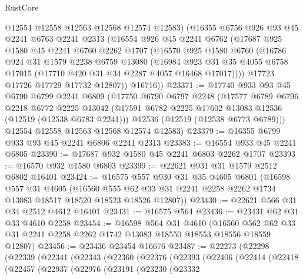 \begin{lexlean}{RustCore}
\begin{coremodule}
        @12554
        @12558
        @12563
        @12568
        @12574
        @12583)
      (@16355
        @6756
        @926
        @93
        @45
        @2241
        @6763
        @2241
        @2313
        (@16554
          @926
          @45
          @2241
          @6762
          (@17687
            @925
            @1580
            @45
            @2241
            @6760
            @2262
            @1707
            (@16570
              @925
              @1580
              @6760
              (@16786
                @924
                @31
                @1579
                @2238
                @6759
                @13080
                (@16984
                  @923
                  @31
                  @35
                  @4055
                  @6758
                  @17015
                  (@17710 @420 @31 @34 @2287 @4057 @16468 @17017))))
            @17723
            @17726
            @17729
            @17732
            @12807))
        @16716))
@23371 := @17740
    @933
    @93
    @45
    @6790
    @6799
    @2241
    @6809
    (@17750
      @6790
      @6797
      @2248
      (@17577
        @6789
        @6796
        @2218
        @6772
        @2225
        @13042
        (@17591 @6782 @2225 @17602 @13083 @12536 (@12519 (@12538 @6783 @2241)))
        @12536
        (@12519 (@12538 @6773 @6789)))
      @12554
      @12558
      @12563
      @12568
      @12574
      @12583)
@23379 := @16355 @6799 @933 @93 @45 @2241 @6806 @2241 @2313
@23383 := @16554 @933 @45 @2241 @6805
@23390 := @17687 @932 @1580 @45 @2241 @6803 @2262 @1707
@23393 := @16570 @932 @1580 @6803
@23399 := @22621 @931 @31 @1579 @2512 @6802 @16401
@23424 := @16575
    @557
    @930
    @31
    @35
    @4605
    @6801
    (@16598
      @557
      @31
      @4605
      (@16560 @555 @62 @33 @31 @2241 @2258 @2262 @1734 @13083 @18517 @18520 @18523 @18526 @12807))
@23430 := @22621 @566 @31 @34 @2512 @4612 @16401
@23431 := @16575 @564
@23436 := @23431 @62 @31 @33 @4610 @2258
@23454 := @16598
    @564
    @31
    @4610
    (@16560 @562 @62 @33 @31 @2241 @2258 @2262 @1742 @13083 @18550 @18553 @18556 @18559 @12807)
@23456 := @23436 @23454 @16676
@23487 := @22273
    (@22298
      (@22339
        (@22341
          (@22343
            (@22360
              (@22376
                (@22393
                  (@22406
                    (@22414
                      (@22418
                        (@22457
                          (@22937
                            (@22976
                              (@23191
                                (@23230
                                  (@23332

\end{coremodule}
\end{lexlean}
